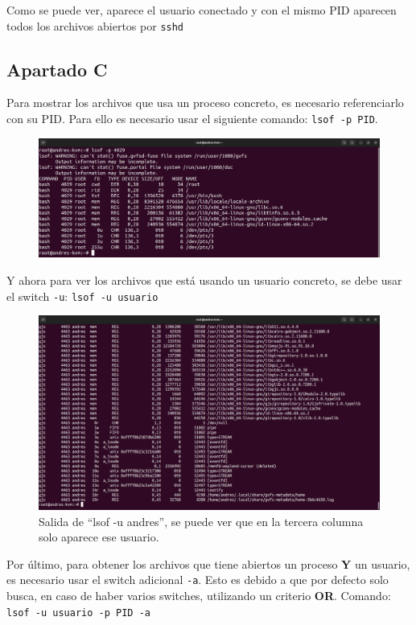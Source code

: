 \documentclass{article}
\begin{document}
Como se puede ver, aparece el usuario conectado y con el mismo PID aparecen todos los archivos abiertos por \verb|sshd|


\subsection*{Apartado C}
Para mostrar los archivos que usa un proceso concreto, es necesario referenciarlo con su PID. Para ello es necesario usar el siguiente comando: \verb|lsof -p PID|.

\begin{figure}[H]
    \includegraphics[width=\textwidth]{imagenes/lsofp.png}
\end{figure} 

Y ahora para ver los archivos que está usando un usuario concreto, se debe usar el switch \verb|-u|: \verb|lsof -u usuario|

\begin{figure}[H]
    \includegraphics[width=\textwidth]{imagenes/lsofuandres.png}
    \caption{Salida de ``lsof -u andres'', se puede ver que en la tercera columna solo aparece ese usuario.}
\end{figure}

Por último, para obtener los archivos que tiene abiertos un proceso \textbf{Y} un usuario, es necesario usar el switch adicional \verb|-a|. Esto es debido a que por defecto solo busca, en caso de haber varios switches, utilizando un criterio \textbf{OR}. Comando: \verb|lsof -u usuario -p PID -a|
\end{document}
